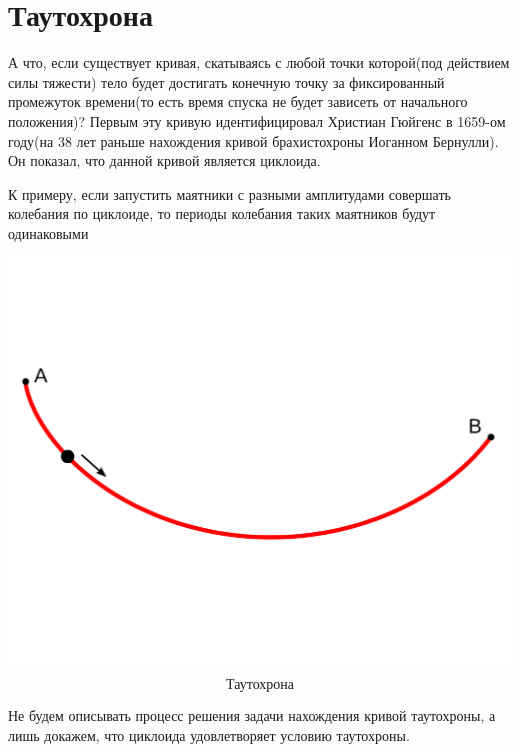 \documentclass[a4paper, 12pt]{article}
\begin{document}
\part{Таутохрона}
А что, если существует кривая, скатываясь с любой точки которой(под действием силы тяжести) тело будет достигать конечную точку за фиксированный промежуток времени(то есть время спуска не будет зависеть от начального положения)? Первым эту кривую идентифицировал Христиан Гюйгенс в 1659-ом году(на 38 лет раньше нахождения кривой брахистохроны Иоганном Бернулли). Он показал, что данной кривой является циклоида.

К примеру, если запустить маятники с разными амплитудами совершать колебания по циклоиде, то периоды колебания таких маятников будут одинаковыми
\begin{center}
\includegraphics[scale=0.2]{taut}
\end{center}
\[\textit{Таутохрона}\]


Не будем описывать процесс решения задачи нахождения кривой таутохроны, а лишь докажем, что циклоида удовлетворяет условию таутохроны.
\end{document}
